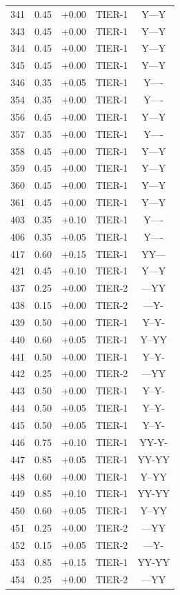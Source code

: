 \begin{longtable}{rlclc}
341 & 0.45 & +0.00 & TIER-1 & Y---Y\\
343 & 0.45 & +0.00 & TIER-1 & Y---Y\\
344 & 0.45 & +0.00 & TIER-1 & Y---Y\\
345 & 0.45 & +0.00 & TIER-1 & Y---Y\\
346 & 0.35 & +0.05 & TIER-1 & Y----\\
354 & 0.35 & +0.00 & TIER-1 & Y----\\
356 & 0.45 & +0.00 & TIER-1 & Y---Y\\
357 & 0.35 & +0.00 & TIER-1 & Y----\\
358 & 0.45 & +0.00 & TIER-1 & Y---Y\\
359 & 0.45 & +0.00 & TIER-1 & Y---Y\\
360 & 0.45 & +0.00 & TIER-1 & Y---Y\\
361 & 0.45 & +0.00 & TIER-1 & Y---Y\\
403 & 0.35 & +0.10 & TIER-1 & Y----\\
406 & 0.35 & +0.05 & TIER-1 & Y----\\
417 & 0.60 & +0.15 & TIER-1 & YY---\\
421 & 0.45 & +0.10 & TIER-1 & Y---Y\\
437 & 0.25 & +0.00 & TIER-2 & ---YY\\
438 & 0.15 & +0.00 & TIER-2 & ---Y-\\
439 & 0.50 & +0.00 & TIER-1 & Y--Y-\\
440 & 0.60 & +0.05 & TIER-1 & Y--YY\\
441 & 0.50 & +0.00 & TIER-1 & Y--Y-\\
442 & 0.25 & +0.00 & TIER-2 & ---YY\\
443 & 0.50 & +0.00 & TIER-1 & Y--Y-\\
444 & 0.50 & +0.05 & TIER-1 & Y--Y-\\
445 & 0.50 & +0.05 & TIER-1 & Y--Y-\\
446 & 0.75 & +0.10 & TIER-1 & YY-Y-\\
447 & 0.85 & +0.05 & TIER-1 & YY-YY\\
448 & 0.60 & +0.00 & TIER-1 & Y--YY\\
449 & 0.85 & +0.10 & TIER-1 & YY-YY\\
450 & 0.60 & +0.05 & TIER-1 & Y--YY\\
451 & 0.25 & +0.00 & TIER-2 & ---YY\\
452 & 0.15 & +0.05 & TIER-2 & ---Y-\\
453 & 0.85 & +0.15 & TIER-1 & YY-YY\\
454 & 0.25 & +0.00 & TIER-2 & ---YY\\

\end{longtable}
